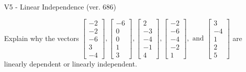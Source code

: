 \begin{exercise}
  \begin{exerciseTitle}V5 - Linear Independence (ver. 686)\end{exerciseTitle}
  \begin{exerciseStatement}
    Explain why the vectors \(\left[\begin{array}{r}
-2 \\
-2 \\
-6 \\
3 \\
-4
\end{array}\right] , \left[\begin{array}{r}
-6 \\
0 \\
0 \\
1 \\
3
\end{array}\right] , \left[\begin{array}{r}
2 \\
-3 \\
-4 \\
-1 \\
4
\end{array}\right] , \left[\begin{array}{r}
-2 \\
-6 \\
-4 \\
-2 \\
1
\end{array}\right] , \text{ and } \left[\begin{array}{r}
3 \\
-4 \\
1 \\
2 \\
5
\end{array}\right]\) are linearly dependent or linearly independent.	



\end{exerciseStatement}
\end{exercise}
